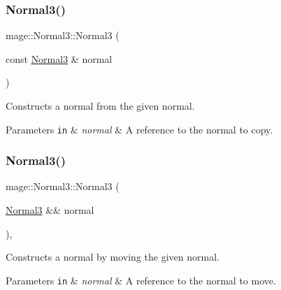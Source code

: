 \subsubsection{\texorpdfstring{Normal3()}{Normal3()}\hspace{0.1cm}{\footnotesize\ttfamily [3/8]}}
{\footnotesize\ttfamily mage\+::\+Normal3\+::\+Normal3 (\begin{DoxyParamCaption}\item[{const \hyperlink{structmage_1_1_normal3}{Normal3} \&}]{normal }\end{DoxyParamCaption})\hspace{0.3cm}{\ttfamily [default]}}

Constructs a normal from the given normal.


\begin{DoxyParams}[1]{Parameters}
\mbox{\tt in}  & {\em normal} & A reference to the normal to copy. \\
\hline
\end{DoxyParams}
\hypertarget{structmage_1_1_normal3_ab29b3dcf7fc05c459f2e9b91b6832115}{}\label{structmage_1_1_normal3_ab29b3dcf7fc05c459f2e9b91b6832115} 
\subsubsection{\texorpdfstring{Normal3()}{Normal3()}\hspace{0.1cm}{\footnotesize\ttfamily [4/8]}}
{\footnotesize\ttfamily mage\+::\+Normal3\+::\+Normal3 (\begin{DoxyParamCaption}\item[{\hyperlink{structmage_1_1_normal3}{Normal3} \&\&}]{normal }\end{DoxyParamCaption})\hspace{0.3cm}{\ttfamily [default]}, {\ttfamily [noexcept]}}

Constructs a normal by moving the given normal.


\begin{DoxyParams}[1]{Parameters}
\mbox{\tt in}  & {\em normal} & A reference to the normal to move. \\
\hline
\end{DoxyParams}
\hypertarget{structmage_1_1_normal3_a477777d95f0ad41e6087668c965dd9b2}{}\label{structmage_1_1_normal3_a477777d95f0ad41e6087668c965dd9b2} 
